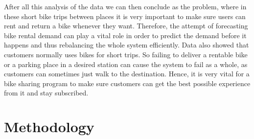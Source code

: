 \begin{figure}
\centering
{}
\end{figure}

After all this analysis of the data we can then conclude as the problem, where in these short bike trips between places it is very important to make sure users can rent and return a bike whenever they want. Therefore, the attempt of forecasting bike rental demand can play a vital role in order to predict the demand before it happens and thus rebalancing the whole system efficiently. Data also showed that customers normally uses bikes for short trips. So failing to deliver a rentable bike or a parking place in a desired station can cause the system to fail as a whole, as customers can sometimes just walk to the destination. Hence, it is very vital for a bike sharing program to make sure customers can get the best possible experience from it and stay subscribed. 


\section {Methodology}
\label{methodology}


